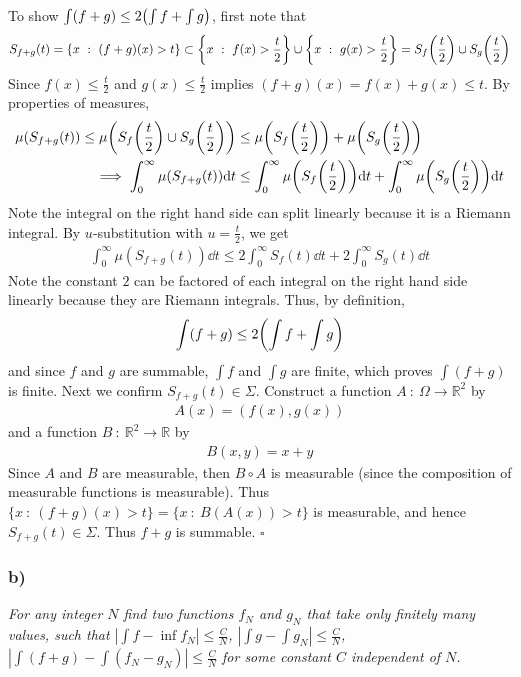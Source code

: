 \documentclass[12pt]{article}
\theoremstyle{plain}
\begin{document}
To show $\int (f + g) \leq 2\qty(\int f + \int g)$, first note that
\begin{align*}
    S_{f + g}(t) = \{x\ :\ (f+g)(x) > t\} \subset \left\{x\ :\ f(x) > \frac{t}{2}\right\} \cup \left\{x\ :\ g(x) > \frac{t}{2}\right\} = S_f\qty(\frac{t}{2}) \cup S_g\qty(\frac{t}{2})
\end{align*}
Since $f(x) \leq \frac{t}{2}$ and $g(x) \leq \frac{t}{2}$ implies $(f + g)(x) = f(x) + g(x) \leq t$.  By properties of measures, 
\begin{align*}
    \mu(S_{f + g}(t)) \leq \mu\qty(S_f\qty(\frac{t}{2}) \cup S_g\qty(\frac{t}{2})) &\leq \mu\qty(S_f\qty(\frac{t}{2})) + \mu\qty(S_g\qty(\frac{t}{2})) \\
    \implies \int_0^\infty \mu(S_{f + g}(t)) \dd t &\leq \int_0^\infty \mu\qty(S_f\qty(\frac{t}{2}))\dd t + \int_0^\infty \mu\qty(S_g\qty(\frac{t}{2}))\dd t
\end{align*}
Note the integral on the right hand side can split linearly because it is a Riemann integral.  By $u$-substitution with $u = \frac{t}{2}$, we get
\begin{align*}
    \int_0^\infty \mu(S_{f + g}(t))\dd t \leq 2\int_0^\infty S_f(t)\dd t + 2\int_0^\infty S_g(t)\dd t
\end{align*}
Note the constant $2$ can be factored of each integral on the right hand side linearly because they are Riemann integrals.  Thus, by definition,
\begin{align*}
    \int (f + g) \leq 2\qty(\int f + \int g)
\end{align*}
and since $f$ and $g$ are summable, $\int f$ and $\int g$ are finite, which proves $\int (f + g)$ is finite.  Next we confirm $S_{f + g}(t) \in \Sigma$.  Construct a function $A\ :\ \Omega \rightarrow \mathbb{R}^2$ by
\begin{align*}
    A(x) = (f(x), g(x))
\end{align*}
and a function $B\ :\ \mathbb{R}^2 \rightarrow \mathbb{R}$ by
\begin{align*}
    B(x, y) = x + y
\end{align*}
Since $A$ and $B$ are measurable, then $B\circ A$ is measurable (since the composition of measurable functions is measurable).  Thus $\{x\ :\ (f + g)(x) > t\} = \{x\ :\ B(A(x)) > t\}$ is measurable, and hence $S_{f + g}(t) \in \Sigma$.  Thus $f + g$ is summable. \hfill $\square$

\subsubsection*{ b)}
\emph{For any integer $N$ find two functions $f_N$ and $g_N$ that take only finitely many values, such that $|\int f - \inf f_N| \leq \frac{C}{N}$, $|\int g - \int g_N| \leq \frac{C}{N}$, $|\int(f + g) - \int(f_N - g_N)| \leq \frac{C}{N}$ for some constant $C$ independent of $N$.}
\end{document}
